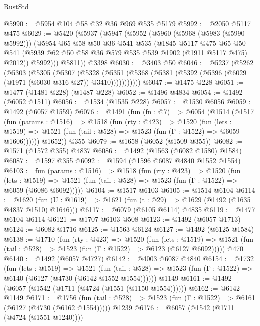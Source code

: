 \begin{lexlean}{RustStd}
\begin{coremodule}
@5990 := @5954 @104 @58 @32 @36 @969 @535 @5179
@5992 := @2050 @5117 @475
@6029 := @5420
    (@5937
      (@5947
        (@5952
          (@5960
            (@5968 (@5983 (@5990 @5992)))
            (@5954
              @65
              @58
              @50
              @36
              @541
              @535
              (@1845
                @5117
                @475
                @65
                @50
                @541
                (@5939 @62 @50 @58 @36 @579 @535 @539 @1902 (@1911 @5117 @475) @2012))
              @5992)))
        @5811))
    @3398
@6030 := @3403 @50
@6046 := @5237
    (@5262
      (@5303
        (@5305
          (@5307
            (@5328
              (@5351 (@5368 (@5381 (@5392 (@5396 (@6029 (@1971 (@6030 @316 @27)) @3410)))))))))))
@6047 := @1475 @228
@6051 := @1477 (@1481 @228) (@1487 @228)
@6052 := @1496 @4834
@6054 := @1492 (@6052 @1511)
@6056 := @1534 (@1535 @228)
@6057 := @1530 @6056
@6059 := @1492 (@6057 @1559)
@6076 := @1491
    (fun (fn : @7) =>
    @6054
      (@1514
        (@1517
          (fun (params : @1516) =>
          @1518
            (fun (rty : @423) =>
            @1520
              (fun (lets : @1519) =>
              @1521 (fun (tail : @528) => @1523 (fun (Γ : @1522) => @6059 @1606))))))
        @1652))
    @355
@6079 := @1658 (@6052 (@1509 @355))
@6082 := @1571 (@1572 @355) @4837
@6086 := @1492 (@1563 (@6082 @1580) @1584)
@6087 := @1597 @355
@6092 := @1594 (@1596 @6087 @4840 @1552 @1554)
@6103 := fun (params : @1516) =>
  @1518
    (fun (rty : @423) =>
    @1520
      (fun (lets : @1519) =>
      @1521 (fun (tail : @528) => @1523 (fun (Γ : @1522) => @6059 (@6086 @6092)))))
@6104 := @1517 @6103
@6105 := @1514 @6104
@6114 := @1620 (fun (U : @1619) => @1621 (fun (t : @29) => @1629 (@1492 (@1635 @4837 @1510) @1646)))
@6117 := @6079 (@6105 @6114) @4835
@6119 := @1477 @6104 @6114
@6121 := @1707 @6103 @508
@6123 := @1492 (@6057 @1713)
@6124 := @6082 @1716
@6125 := @1563 @6124
@6127 := @1492 (@6125 @1584)
@6138 := @1710
    (fun (rty : @423) =>
    @1520
      (fun (lets : @1519) =>
      @1521 (fun (tail : @528) => @1523 (fun (Γ : @1522) => @6123 (@6127 @6092)))))
    @470
@6140 := @1492 (@6057 @4727)
@6142 := @4003 @6087 @4840
@6154 := @1732
    (fun (lets : @1519) =>
    @1521
      (fun (tail : @528) => @1523 (fun (Γ : @1522) => @6140 (@6127 (@4730 (@6142 @1552 @1554))))))
    @1149
@6161 := @1492 (@6057 (@1542 (@1711 (@4724 (@1551 (@1150 @1554))))))
@6162 := @6142 @1149
@6171 := @1756
    (fun (tail : @528) => @1523 (fun (Γ : @1522) => @6161 (@6127 (@4730 (@6162 @1554)))))
    @1239
@6176 := @6057 (@1542 (@1711 (@4724 (@1551 @1240))))

\end{coremodule}
\end{lexlean}
